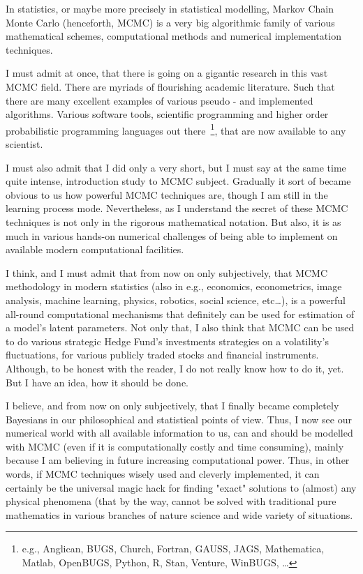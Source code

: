 \documentclass[a4paper,11pt,english]{article}
\begin{document}
		In statistics, or maybe more precisely in statistical modelling, Markov Chain Monte Carlo (henceforth, MCMC) is a very big algorithmic family of 			various mathematical schemes, computational methods and numerical implementation techniques. 
		
		I must admit at once, that there is going on a gigantic research in this vast MCMC field. There are myriads of flourishing academic 
		literature. Such that there are many excellent examples of various pseudo - and implemented algorithms. Various software tools, scientific 
		programming and higher order probabilistic programming languages out there~\footnote{e.g., Anglican, BUGS, Church, Fortran, GAUSS, JAGS, 
		Mathematica, Matlab, OpenBUGS, Python, R, Stan, Venture, WinBUGS, \ldots}, that are now available to any scientist. 
		
		I must also admit that I did only a very short, but I must say at the same time quite intense, introduction study to MCMC subject. Gradually 
		it sort of became obvious to us how powerful MCMC techniques are, though I am still in the learning process mode. Nevertheless, as I 	
		understand the secret of these MCMC techniques is not only in the rigorous mathematical notation. But also, it is as much in various hands-on 
		numerical challenges of being able to implement on available modern computational facilities. 
		
		I think, and I must admit that from now on only subjectively, that MCMC methodology in modern statistics (also in e.g., economics, 
		econometrics, image analysis, machine learning, physics, robotics, social science, etc\ldots), is a powerful all-round computational mechanisms 
		that definitely can be used for estimation of a model's latent parameters. Not only that, I also think that MCMC can be used to do various 
		strategic Hedge Fund's investments strategies on a volatility's fluctuations, for various publicly traded stocks and financial instruments. 
		Although, to be honest with the reader, I do not really know how to do it, yet. But I have an idea, how it should be done. 

		I believe, and from now on only subjectively, that I finally became completely Bayesians in our philosophical and statistical points of view. 
		Thus, I now see our numerical world with all available information to us, can and should be modelled with MCMC (even if it 
		is computationally costly and time consuming), mainly because I am believing in future increasing computational power. Thus, in other words, if 
		MCMC techniques wisely used and cleverly implemented, it can certainly be the universal magic hack for finding "exact" solutions to (almost) any 
		physical phenomena (that by the way, cannot be solved with traditional pure mathematics in various branches of nature science and wide variety of 
		situations.  
		
\end{document}
